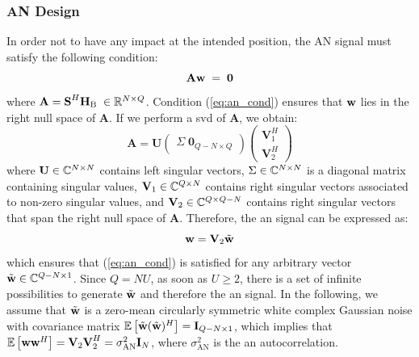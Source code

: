  


\subsubsection{AN Design}
In order not to have any impact at the intended position, the AN signal must satisfy the following condition:
\begin{equation}
    \textbf{A} \textbf{w} \; = \; \textbf{0}
    \label{eq:an_cond}
\end{equation}
where $\textbf{A} = \textbf{S}^H\textbf{H}_{\text{B}}\; \in \mathbb{R}^{N\times Q}$. Condition (\ref{eq:an_cond}) ensures that $\textbf{w}$ lies in the right null space of $\textbf{A}$. If we perform a \gls{svd} of $\textbf{A}$, we obtain:
\begin{equation}
    \textbf{A} = \textbf{U} 
    \begin{pmatrix}
    \Sigma \; \textbf{0}_{Q-N\times Q}
    \end{pmatrix}
    \begin{pmatrix}
    \textbf{V}_1^H \\
    \textbf{V}_2^H
    \end{pmatrix}
    \label{eq:an_svd}
\end{equation}
where $\textbf{U} \in \mathbb{C}^{N \times N}$ contains left singular vectors, $\Sigma \in \mathbb{C}^{N \times N}$ is a diagonal matrix containing singular values, $\textbf{V}_1 \in \mathbb{C}^{Q \times N}$ contains right singular vectors associated to non-zero singular values, and $\textbf{V}_2 \in \mathbb{C}^{Q \times Q-N}$ contains right singular vectors that span the right null space of $\textbf{A}$. Therefore, the \gls{an} signal can be expressed as:
\begin{equation}
    \textbf{w} = \textbf{V}_2 \tilde{\textbf{w}}
    \label{eq:an_w}
\end{equation}
which ensures that (\ref{eq:an_cond}) is satisfied for any arbitrary vector $\tilde{\textbf{w}} \in \mathbb{C}^{Q-N \times 1}$. Since $Q = NU$, as soon as $U\geq 2$, there is a set of infinite possibilities to generate $\tilde{\textbf{w}}$ and therefore the \gls{an} signal. In the following, we assume that $\tilde{\textbf{w}}$ is a zero-mean circularly symmetric white complex Gaussian noise with covariance matrix $\mathbb{E} \left[\tilde{\textbf{w}}(\tilde{\textbf{w}})^H\right] = \textbf{I}_{Q-N \times 1}$, which implies that $\mathbb{E} \left[\textbf{ww}^H\right] = \textbf{V}_2 \textbf{V}_2^H = \sigma^2_{\text{AN}} \textbf{I}_N$, where $\sigma^2_{\text{AN}}$ is the \gls{an} autocorrelation.


